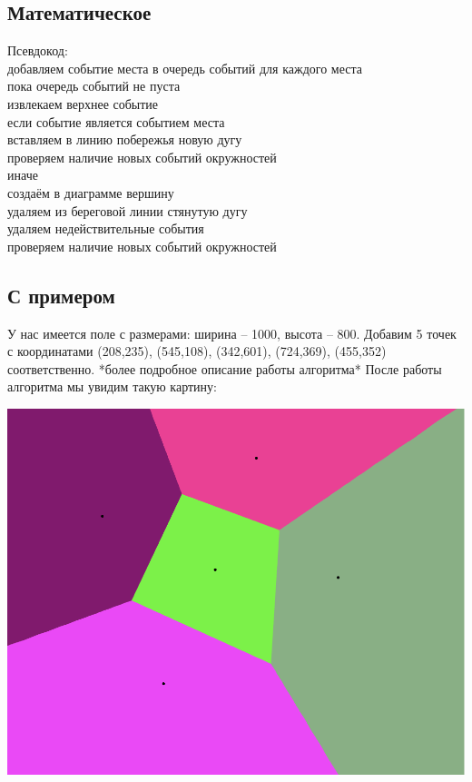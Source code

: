 \documentclass[12 pt, a4paper]{article}
\begin{document}
\subsection{Математическое}
Псевдокод:\\
добавляем событие места в очередь событий для каждого места\\
пока очередь событий не пуста\\
   извлекаем верхнее событие\\
    если событие является событием места\\
        вставляем в линию побережья новую дугу\\
        проверяем наличие новых событий окружностей\\
    иначе\\
        создаём в диаграмме вершину\\
        удаляем из береговой линии стянутую дугу\\
        удаляем недействительные события\\
        проверяем наличие новых событий окружностей\\
\subsection{С примером}
У нас имеется поле с размерами: ширина – 1000, высота – 800. 
Добавим 5 точек с координатами (208,235), (545,108), (342,601), (724,369), (455,352) соответственно.
*более подробное описание работы алгоритма*
После работы алгоритма мы увидим такую картину: \\
\begin{center}
\includegraphics[scale = 0.4]{Диаграмма для задачи}
\end{center}
\end{document}

